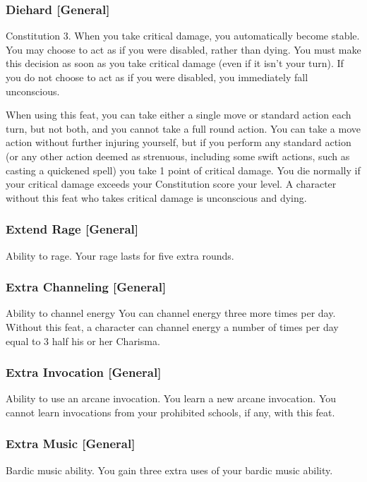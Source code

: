 \subsubsection{Diehard [General]}
 Constitution 3.
 When you take critical damage, you automatically become stable. You may choose to act as if you were disabled, rather than dying. You must make this decision as soon as you take critical damage (even if it isn't your turn). If you do not choose to act as if you were disabled, you immediately fall unconscious.
\par When using this feat, you can take either a single move or standard action each turn, but not both, and you cannot take a full round action. You can take a move action without further injuring yourself, but if you perform any standard action (or any other action deemed as strenuous, including some swift actions, such as casting a quickened spell) you take 1 point of critical damage. You die normally if your critical damage exceeds your Constitution score \add your level.
 A character without this feat who takes critical damage is unconscious and dying.

\subsubsection{Extend Rage [General]}
 Ability to rage.
 Your rage lasts for five extra rounds.

\subsubsection{Extra Channeling [General]}
 Ability to channel energy
 You can channel energy three more times per day. 
 Without this feat, a character can channel energy a number of times per day equal to 3 \add half his or her Charisma.

\subsubsection{Extra Invocation [General]}
 Ability to use an arcane invocation.
 You learn a new arcane invocation. You cannot learn invocations from your prohibited schools, if any, with this feat.

\subsubsection{Extra Music [General]}
 Bardic music ability.
 You gain three extra uses of your bardic music ability.

